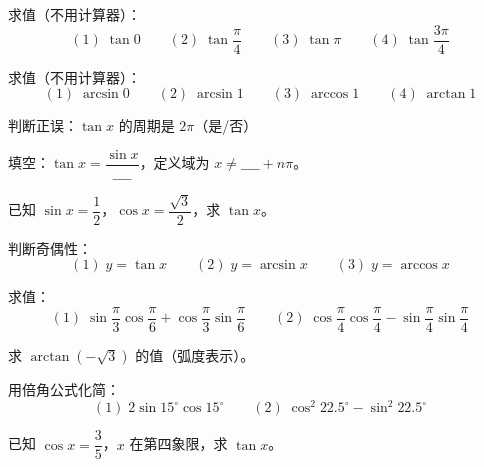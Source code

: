 \begin{exercise}[0]
求值（不用计算器）：
\[
(1)\; \tan 0 \qquad (2)\; \tan \frac{\pi}{4} \qquad (3)\; \tan \pi \qquad (4)\; \tan \frac{3\pi}{4}
\]
\end{exercise}

\begin{exercise}[0]
求值（不用计算器）：
\[
(1)\; \arcsin 0 \qquad (2)\; \arcsin 1 \qquad (3)\; \arccos 1 \qquad (4)\; \arctan 1
\]
\end{exercise}

\begin{exercise}[0]
判断正误：\(\tan x\) 的周期是 \(2\pi\)（是/否）
\end{exercise}

\begin{exercise}[0]
填空：\(\tan x = \dfrac{\sin x}{\_\_\_\_}\)，定义域为 \(x \neq \_\_\_\_ + n\pi\)。
\end{exercise}


\begin{exercise}[1]
已知 \(\sin x = \dfrac{1}{2}\)，\(\cos x = \dfrac{\sqrt{3}}{2}\)，求 \(\tan x\)。
\end{exercise}

\begin{exercise}[1]
判断奇偶性：
\[
(1)\; y = \tan x \qquad (2)\; y = \arcsin x \qquad (3)\; y = \arccos x
\]
\end{exercise}

\begin{exercise}[1]
求值：
\[
(1)\; \sin\frac{\pi}{3}\cos\frac{\pi}{6} + \cos\frac{\pi}{3}\sin\frac{\pi}{6} \qquad
(2)\; \cos\frac{\pi}{4}\cos\frac{\pi}{4} - \sin\frac{\pi}{4}\sin\frac{\pi}{4}
\]
\end{exercise}

\begin{exercise}[1]
求 \(\arctan(-\sqrt{3})\) 的值（弧度表示）。
\end{exercise}


\begin{exercise}[2]
用倍角公式化简：
\[
(1)\; 2\sin 15^\circ \cos 15^\circ \qquad
(2)\; \cos^2 22.5^\circ - \sin^2 22.5^\circ
\]
\end{exercise}

\begin{exercise}[2]
已知 \(\cos x = \dfrac{3}{5}\)，\(x\) 在第四象限，求 \(\tan x\)。
\end{exercise}

